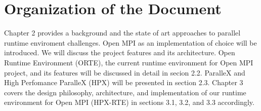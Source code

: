 \section{Organization of the Document}
Chapter 2 provides a background and the state of art approaches to parallel runtime enviroment challenges. Open MPI as an implementation of choice will be introduced. We will discuss the project features and its architecture. Open Runtime Environment (ORTE), the current runtime environment for Open MPI project, and its features will be discussed in detail in secion 2.2. ParalleX and High Perfomance ParalleX (HPX) will be presented in section 2.3. Chapter 3 covers the design philosophy, architecture, and implementation of our runtime environment for Open MPI (HPX-RTE) in sections 3.1, 3.2, and 3.3 accordingly.

